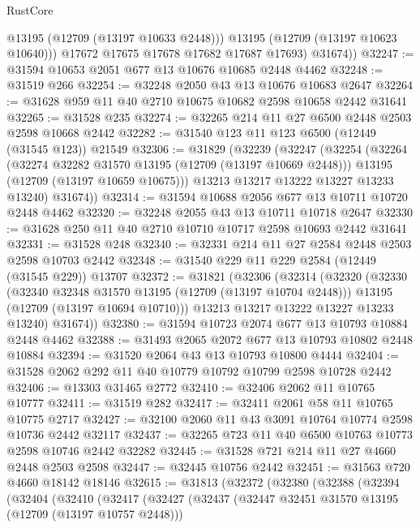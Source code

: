\begin{lexlean}{RustCore}
\begin{coremodule}
              @13195
              (@12709 (@13197 @10633 @2448)))
            @13195
            (@12709 (@13197 @10623 @10640)))
          @17672
          @17675
          @17678
          @17682
          @17687
          @17693)
        @31674))
@32247 := @31594 @10653 @2051 @677 @13 @10676 @10685 @2448 @4462
@32248 := @31519 @266
@32254 := @32248 @2050 @43 @13 @10676 @10683 @2647
@32264 := @31628 @959 @11 @40 @2710 @10675 @10682 @2598 @10658 @2442 @31641
@32265 := @31528 @235
@32274 := @32265 @214 @11 @27 @6500 @2448 @2503 @2598 @10668 @2442
@32282 := @31540 @123 @11 @123 @6500 (@12449 (@31545 @123)) @21549
@32306 := @31829
    (@32239
      (@32247
        (@32254
          (@32264
            (@32274 @32282 @31570 @13195 (@12709 (@13197 @10669 @2448)))
            @13195
            (@12709 (@13197 @10659 @10675)))
          @13213
          @13217
          @13222
          @13227
          @13233
          @13240)
        @31674))
@32314 := @31594 @10688 @2056 @677 @13 @10711 @10720 @2448 @4462
@32320 := @32248 @2055 @43 @13 @10711 @10718 @2647
@32330 := @31628 @250 @11 @40 @2710 @10710 @10717 @2598 @10693 @2442 @31641
@32331 := @31528 @248
@32340 := @32331 @214 @11 @27 @2584 @2448 @2503 @2598 @10703 @2442
@32348 := @31540 @229 @11 @229 @2584 (@12449 (@31545 @229)) @13707
@32372 := @31821
    (@32306
      (@32314
        (@32320
          (@32330
            (@32340 @32348 @31570 @13195 (@12709 (@13197 @10704 @2448)))
            @13195
            (@12709 (@13197 @10694 @10710)))
          @13213
          @13217
          @13222
          @13227
          @13233
          @13240)
        @31674))
@32380 := @31594 @10723 @2074 @677 @13 @10793 @10884 @2448 @4462
@32388 := @31493 @2065 @2072 @677 @13 @10793 @10802 @2448 @10884
@32394 := @31520 @2064 @43 @13 @10793 @10800 @4444
@32404 := @31528 @2062 @292 @11 @40 @10779 @10792 @10799 @2598 @10728 @2442
@32406 := @13303 @31465 @2772
@32410 := @32406 @2062 @11 @10765 @10777
@32411 := @31519 @282
@32417 := @32411 @2061 @58 @11 @10765 @10775 @2717
@32427 := @32100 @2060 @11 @43 @3091 @10764 @10774 @2598 @10736 @2442 @32117
@32437 := @32265 @723 @11 @40 @6500 @10763 @10773 @2598 @10746 @2442 @32282
@32445 := @31528 @721 @214 @11 @27 @4660 @2448 @2503 @2598
@32447 := @32445 @10756 @2442
@32451 := @31563 @720 @4660 @18142 @18146
@32615 := @31813
    (@32372
      (@32380
        (@32388
          (@32394
            (@32404
              (@32410
                (@32417
                  (@32427
                    (@32437
                      (@32447 @32451 @31570 @13195 (@12709 (@13197 @10757 @2448)))

\end{coremodule}
\end{lexlean}
